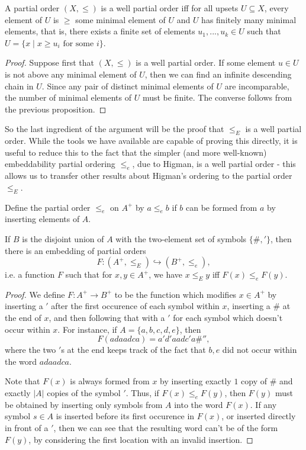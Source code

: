 \documentclass[letterpaper,11pt]{article}
\begin{document}
\begin{prop} A partial order $(X,\le)$ is a well partial order iff for all upsets $U \subseteq X$, every element of $U$ is $\ge$ some minimal element of $U$ and $U$ has finitely many minimal elements, that is, there exists a finite set of elements $u_1, ..., u_k \in U$ such that $U = \{x \mid x \ge u_i\text{ for some }i\}$.
\end{prop}
\begin{proof} Suppose first that $(X,\le)$ is a well partial order. If some element $u \in U$ is not above any minimal element of $U$, then we can find an infinite descending chain in $U$. Since any pair of distinct minimal elements of $U$ are incomparable, the number of minimal elements of $U$ must be finite. The converse follows from the previous proposition.
\end{proof}

So the last ingredient of the argument will be the proof that $\le_E$ is a well partial order. While the tools we have available are capable of proving this directly, it is useful to reduce this to the fact that the simpler (and more well-known) embeddability partial ordering $\le_e$, due to Higman, is a well partial order - this allows us to transfer other results about Higman's ordering to the partial order $\le_E$.

\begin{defn} Define the partial order $\le_e$ on $A^+$ by $a \le_e b$ if $b$ can be formed from $a$ by inserting elements of $A$.
\end{defn}

\begin{prop} If $B$ is the disjoint union of $A$ with the two-element set of symbols $\{\#,'\}$, then there is an embedding of partial orders
\[
F : (A^+, \le_E) \hookrightarrow (B^+, \le_e),
\]
i.e. a function $F$ such that for $x,y \in A^+$, we have $x \le_E y$ iff $F(x) \le_e F(y)$.
\end{prop}
\begin{proof} We define $F : A^+ \rightarrow B^+$ to be the function which modifies $x \in A^+$ by inserting a $'$ after the first occurence of each symbol within $x$, inserting a $\#$ at the end of $x$, and then following that with a $'$ for each symbol which doesn't occur within $x$. For instance, if $A = \{a,b,c,d,e\}$, then
\[
F(adaadca) = a'd'aadc'a\#'',
\]
where the two $'$s at the end keeps track of the fact that $b,e$ did not occur within the word $adaadca$.

Note that $F(x)$ is always formed from $x$ by inserting exactly $1$ copy of $\#$ and exactly $|A|$ copies of the symbol $'$. Thus, if $F(x) \le_e F(y)$, then $F(y)$ must be obtained by inserting only symbols from $A$ into the word $F(x)$. If any symbol $s \in A$ is inserted before its first occurence in $F(x)$, or inserted directly in front of a $'$, then we can see that the resulting word can't be of the form $F(y)$, by considering the first location with an invalid insertion.
\end{proof}
\end{document}
